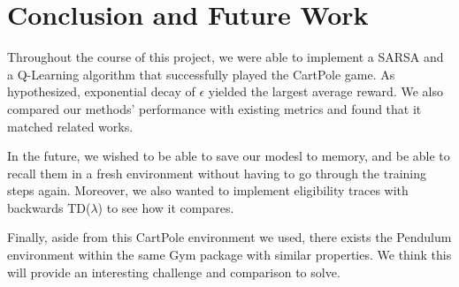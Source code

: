 \section{Conclusion and Future Work}

Throughout the course of this project, we were able to implement a SARSA and a Q-Learning algorithm that successfully played the CartPole game. 
As hypothesized, exponential decay of $\epsilon$ yielded the largest average reward. We also compared our methods' performance with existing metrics
and found that it matched related works. 

In the future, we wished to be able to save our modesl to memory, and be able to recall them in a fresh environment without having to go through the training
steps again. Moreover, we also wanted to implement eligibility traces with backwards TD($\lambda$) to see how it compares.

Finally, aside from this CartPole environment we used, there exists the Pendulum environment within the same Gym package with similar properties. We think this
will provide an interesting challenge and comparison to solve.